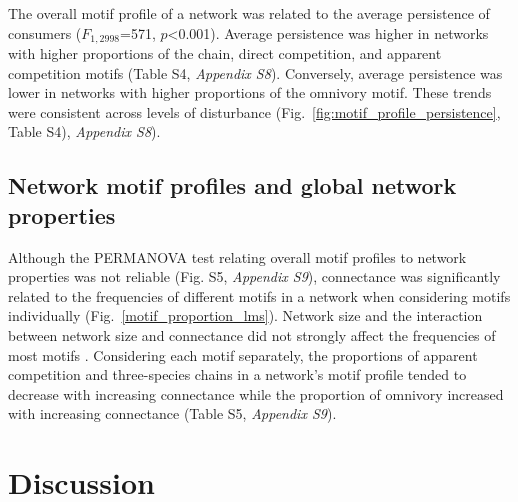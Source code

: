 \documentclass[12pt]{article}
\begin{document}
\begin{spacing}{2.0}
        The overall motif profile of a network was related to the average persistence of consumers ($F_{1,2998}$=571, $p$\textless0.001). 
        Average persistence was higher in networks with higher proportions of the chain, direct competition, and apparent competition motifs (Table S4, \emph{Appendix S8}). 
        Conversely, average persistence was lower in networks with higher proportions of the omnivory motif. 
        These trends were consistent across levels of disturbance (Fig.~\ref{fig:motif_profile_persistence}, Table S4), \emph{Appendix S8}).%


    \subsection*{Network motif profiles and global network properties}

        Although the PERMANOVA test relating overall motif profiles to network properties was not reliable (Fig. S5, \emph{Appendix S9}), 
        connectance was significantly related to the frequencies of different motifs in a network when considering motifs individually (Fig.~\ref{motif_proportion_lms}).
        Network size and the interaction between network size and connectance did not strongly affect the frequencies of most motifs .
        Considering each motif separately, the proportions of apparent competition and three-species chains in a network's motif profile tended to decrease with increasing connectance while the proportion of omnivory increased with increasing connectance (Table S5, \emph{Appendix S9}). 
    









\section*{Discussion}


\end{spacing}
\end{document}
